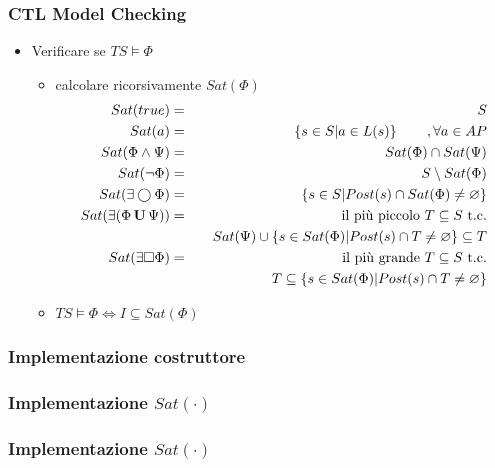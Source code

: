\begin{frame}
  \frametitle{\acs{CTL} Model Checking}
  \begin{itemize}
  \item \alert{Verificare} se $TS\models\Phi$
    \begin{itemize}
    \item \alert{calcolare} ricorsivamente $Sat(\Phi)$
      \begin{eqnarray*}
        Sat(true)&=&S\\
        Sat(a)&=&\left\{s\in S| a\in L(s)\right\}\qquad,\forall a\in
        AP\\
        Sat(\Phi\land\Psi)&=&Sat(\Phi)\cap Sat(\Psi)\\
        Sat(\neg\Phi)&=&S\setminus Sat(\Phi)\\
        Sat(\exists\bigcirc\Phi)&=&\left\{s\in S|Post(s)\cap Sat(\Phi)\neq\varnothing\right\}\\
        Sat(\exists(\Phi\,\mathbf{U}\,\Psi))&=&\text{il pi\`u piccolo }T\subseteq
        S\text{ t.c.}\\
        &&\quad Sat(\Psi)\cup\left\{s\in Sat(\Phi)|Post(s)\cap
          T\neq\varnothing\right\}\subseteq T\\
        Sat(\exists\Box\Phi)&=&\text{il pi\`u grande }T\subseteq
        S\text{ t.c.}\\
        &&\quad T\subseteq\left\{s\in Sat(\Phi)|Post(s)\cap
          T\neq\varnothing\right\}
      \end{eqnarray*}
    \item $TS\models\Phi \Leftrightarrow I\subseteq Sat(\Phi)$
    \end{itemize}
  \end{itemize}
\end{frame}

\begin{frame}[fragile]
  \frametitle{Implementazione costruttore}
\end{frame}

\begin{frame}[fragile]
  \frametitle{Implementazione $Sat(\cdot)$}
\end{frame}

\begin{frame}[fragile]
  \frametitle{Implementazione $Sat(\cdot)$}
\end{frame}

